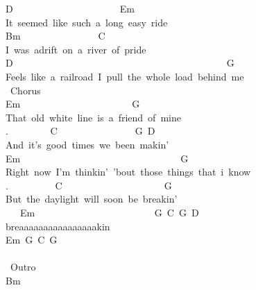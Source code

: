 {D\ \ \ \ \ \ \ \ \ \ \ \ \ \ \ \ \ \ \ \ \ \ Em\\
It\ seemed\ like\ such\ a\ long\ easy\ ride\\
Bm\ \ \ \ \ \ \ \ \ \ \ \ \ \ \ \ C\\
I\ was\ adrift\ on\ a\ river\ of\ pride\\
D\ \ \ \ \ \ \ \ \ \ \ \ \ \ \ \ \ \ \ \ \ \ \ \ \ \ \ \ \ \ \ \ \ \ \ \ \ \ \ \ \ \ \ \ G\\
Feels\ like\ a\ railroad\ I\ pull\ the\ whole\ load\ behind\ me\\
\lbrack\ Chorus\rbrack\\
Em\ \ \ \ \ \ \ \ \ \ \ \ \ \ \ \ \ \ \ \ \ \ \ G\\
That\ old\ white\ line\ is\ a\ friend\ of\ mine\\
. \ \ \ \ \ \ \ \ C\ \ \ \ \ \ \ \ \ \ \ \ \ \ \ \ G\ D\\
And\ it's\ good\ times\ we\ been\ makin'\\
Em\ \ \ \ \ \ \ \ \ \ \ \ \ \ \ \ \ \ \ \ \ \ \ \ \ \ \ \ \ \ \ \ \ G\\
Right\ now\ I'm\ thinkin'\ 'bout\ those\ things\ that\ i\ know\\
. \ \ \ \ \ \ \ \ \ C\ \ \ \ \ \ \ \ \ \ \ \ \ \ \ \ \ \ \ \ \ G\\
But\ the\ daylight\ will\ soon\ be\ breakin'\\
\ \ \ Em \ \ \ \ \ \ \ \ \ \ \ \ \ \ \ \ \ \ \ \ \ \ \ \ G\ C\ G\ D\\
breaaaaaaaaaaaaaaaakin\\
Em\ G\ C\ G\\
\\
\lbrack\ Outro\rbrack\\
Bm}
